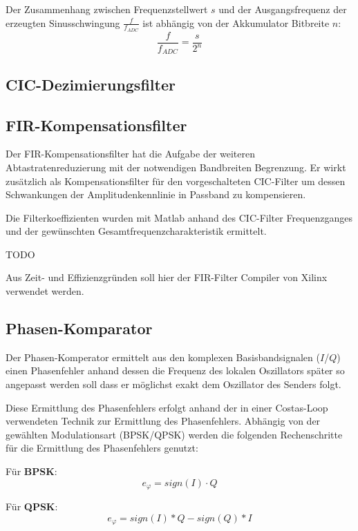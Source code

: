 Der Zusammenhang zwischen Frequenzstellwert $s$ und der Ausgangsfrequenz der erzeugten Sinusschwingung $\frac{f}{f_{ADC}}$ ist abhängig von der Akkumulator Bitbreite $n$:
\begin{equation}
	\frac{f}{f_{ADC}} = \frac{s}{2^n}
\end{equation}

\subsection{\acs{CIC}-Dezimierungsfilter}

\subsection{\acs{FIR}-Kompensationsfilter}
Der \acs{FIR}-Kompensationsfilter hat die Aufgabe der weiteren Abtastratenreduzierung mit der notwendigen Bandbreiten Begrenzung. 
Er wirkt zusätzlich als Kompensationsfilter für den vorgeschalteten \acs{CIC}-Filter um dessen Schwankungen der Amplitudenkennlinie in Passband zu kompensieren.

Die Filterkoeffizienten wurden mit Matlab anhand des \acs{CIC}-Filter Frequenzganges und der gewünschten Gesamtfrequenzcharakteristik ermittelt.

TODO

Aus Zeit- und Effizienzgründen soll hier der \acs{FIR}-Filter Compiler\cite{XLX_FIR} von Xilinx verwendet werden.

\subsection{Phasen-Komparator}
Der Phasen-Komperator ermittelt aus den komplexen Basisbandsignalen ($I$/$Q$) einen Phasenfehler anhand dessen die Frequenz des lokalen Oszillators später so angepasst werden soll
dass er möglichst exakt dem Oszillator des Senders folgt.

Diese Ermittlung des Phasenfehlers erfolgt anhand der in einer Costas-Loop verwendeten Technik zur Ermittlung des Phasenfehlers.\cite{WPI_COSTAS}
Abhängig von der gewählten Modulationsart (\acs{BPSK}/\acs{QPSK}) werden die folgenden Rechenschritte für die Ermittlung des Phasenfehlers genutzt:

Für \textbf{\acs{BPSK}}:
\begin{equation}
	e_\varphi = sign(I)\cdot Q
\end{equation}

Für \textbf{\acs{QPSK}}:
\begin{equation}
	e_\varphi = sign(I)*Q - sign(Q)*I
\end{equation}

